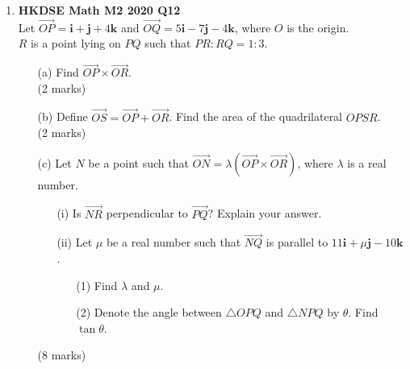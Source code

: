 \documentclass{report}
\begin{document}
\begin{enumerate}
	\item \textbf{HKDSE Math M2 2020 Q12}\\
	Let $\overrightarrow{OP} = \textbf{i} + \textbf{j}+ 4\textbf {k}$ and $\overrightarrow{OQ} = 5\textbf{i} -7 \textbf{j}- 4\textbf {k}$, where $O$ is the origin. \\
	$R$ is a point lying on $PQ$ such that $PR:RQ = 1:3$. 
	\begin{enumerate}
		\item [(a)]Find $\overrightarrow{OP} \times \overrightarrow{OR}$. \\(2 marks)
		\item [(b)]Define $\overrightarrow{OS} = \overrightarrow{OP} + \overrightarrow{OR}$. Find the area of the quadrilateral $OPSR$. \\(2 marks)
		\item [(c)]Let $N$ be a point such that $\overrightarrow{ON} = \lambda(\overrightarrow{OP}\times \overrightarrow{OR})$, where $\lambda$ is a real number.
		\begin{enumerate}
			\item [(i)]Is $\overrightarrow{NR}$ perpendicular to $\overrightarrow{PQ}$? Explain your answer.
			\item [(ii)]Let $\mu$ be a real number such that $\overrightarrow{NQ}$ is parallel to $11\textbf{i} + \mu\textbf{j}-10\textbf {k}$. 
			\begin{enumerate}
				\item [(1)]Find $\lambda$ and $\mu$. 
				\item [(2)]Denote the angle between $\triangle OPQ$ and $\triangle NPQ$ by $\theta$. Find $\tan{\theta}$.
			\end{enumerate}
		\end{enumerate}
		(8 marks)
	\end{enumerate}

\end{enumerate}
\end{document}
